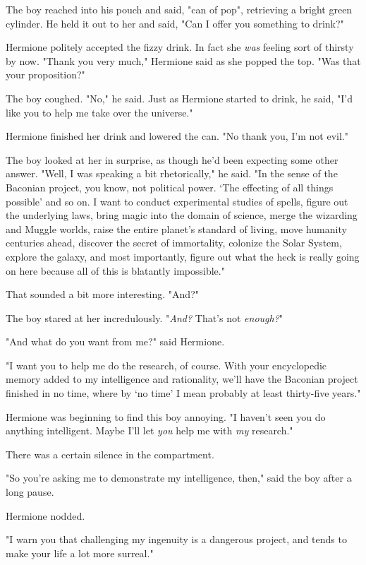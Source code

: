 The boy reached into his pouch and said, "can of pop", retrieving a bright
green cylinder. He held it out to her and said, "Can I offer you something to
drink?"

Hermione politely accepted the fizzy drink. In fact she \emph{was} feeling sort
of thirsty by now. "Thank you very much," Hermione said as she popped the top.
"Was that your proposition?"

The boy coughed. "No," he said. Just as Hermione started to drink, he said,
"I'd like you to help me take over the universe."

Hermione finished her drink and lowered the can. "No thank you, I'm not evil."

The boy looked at her in surprise, as though he'd been expecting some other
answer. "Well, I was speaking a bit rhetorically," he said. "In the sense of
the Baconian project, you know, not political power. `The effecting of all
things possible' and so on. I want to conduct experimental studies of spells,
figure out the underlying laws, bring magic into the domain of science, merge
the wizarding and Muggle worlds, raise the entire planet's standard of living,
move humanity centuries ahead, discover the secret of immortality, colonize the
Solar System, explore the galaxy, and most importantly, figure out what the
heck is really going on here because all of this is blatantly impossible."

That sounded a bit more interesting. "And?"

The boy stared at her incredulously. "\emph{And?} That's not \emph{enough?}"

"And what do you want from me?" said Hermione.

"I want you to help me do the research, of course. With your encyclopedic
memory added to my intelligence and rationality, we'll have the Baconian
project finished in no time, where by `no time' I mean probably at least
thirty-five years."

Hermione was beginning to find this boy annoying. "I haven't seen you do
anything intelligent. Maybe I'll let \emph{you} help me with \emph{my}
research."

There was a certain silence in the compartment.

"So you're asking me to demonstrate my intelligence, then," said the boy after
a long pause.

Hermione nodded.

"I warn you that challenging my ingenuity is a dangerous project, and tends to
make your life a lot more surreal."


